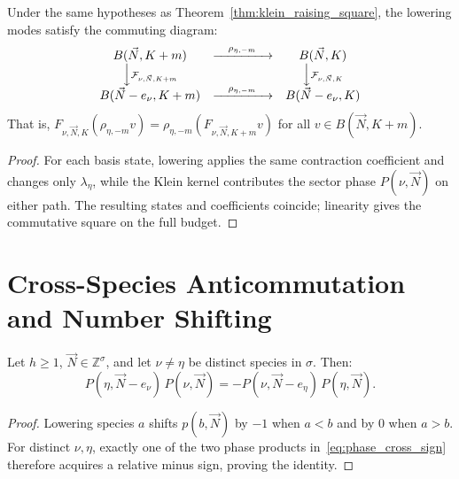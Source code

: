 \begin{theorem}
\label{thm:klein_lowering_square}
Under the same hypotheses as Theorem~\ref{thm:klein_raising_square}, the lowering modes satisfy the commuting diagram:
\begin{equation}
\label{eq:lowering_diagram}
\begin{matrix}
B(\vec{N}, K+m) & \xrightarrow{\quad \rho_{\eta, -m} \quad} & B(\vec{N}, K) \\
\Big\downarrow \scriptstyle{\mathcal{F}_{\nu, \vec{N}, K+m}} & & \Big\downarrow \scriptstyle{\mathcal{F}_{\nu, \vec{N}, K}} \\
B(\vec{N}-e_\nu, K+m) & \xrightarrow{\quad \rho_{\eta, -m} \quad} & B(\vec{N}-e_\nu, K)
\end{matrix}
\end{equation}
That is, $F_{\nu, \vec{N}, K} (\rho_{\eta, -m} v) = \rho_{\eta, -m} (F_{\nu, \vec{N}, K+m} v)$ for all $v \in B(\vec{N}, K+m)$.
\end{theorem}

\begin{proof}
For each basis state, lowering applies the same contraction coefficient and changes only $\lambda_\eta$, while the Klein kernel contributes the sector phase $P(\nu,\vec{N})$ on either path. The resulting states and coefficients coincide; linearity gives the commutative square on the full budget.
\end{proof}

\section{Cross-Species Anticommutation and Number Shifting}

\begin{lemma}
\label{lem:phase_cross_sign}
Let $h \ge 1$, $\vec{N} \in \mathbb{Z}^\sigma$, and let $\nu \neq \eta$ be distinct species in $\sigma$. Then:
\begin{equation}
\label{eq:phase_cross_sign}
P(\eta, \vec{N} - e_\nu)\, P(\nu, \vec{N}) = - P(\nu, \vec{N} - e_\eta)\, P(\eta, \vec{N}).
\end{equation}
\end{lemma}

\begin{proof}
Lowering species $a$ shifts $p(b,\vec{N})$ by $-1$ when $a<b$ and by $0$ when $a>b$. For distinct $\nu,\eta$, exactly one of the two phase products in~\eqref{eq:phase_cross_sign} therefore acquires a relative minus sign, proving the identity.
\end{proof}

